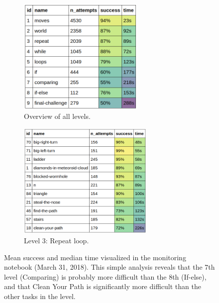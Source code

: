\begin{figure}[htb]
\centering
\begin{subfigure}{.48\textwidth}
\centering
\includegraphics[height=56mm]{img/monitoring-notebook-levels}
\caption{Overview of all levels.}
\end{subfigure}
\begin{subfigure}{.51\textwidth}
\centering
\includegraphics[height=56mm]{img/monitoring-notebook-repeat}
\caption{Level 3: Repeat loop.}
\end{subfigure}
\caption{%
  Mean success and median time visualized in the monitoring notebook
  (March 31, 2018). This simple analysis reveals
  that the 7th level (Comparing) is probably more difficult than the 8th (If-else),
  and that Clean Your Path is significantly more difficult than
  the other tasks in the level.}
\label{fig:monitoring-notebook}
\end{figure}




